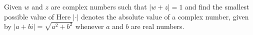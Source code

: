 Given $w$ and $z$ are complex numbers such that $|w+z|=1$ and  find the smallest possible value of  Here $| \cdot |$ denotes the absolute value of a complex number, given by $|a+bi|=\sqrt{a^2+b^2}$ whenever $a$ and $b$ are real numbers.